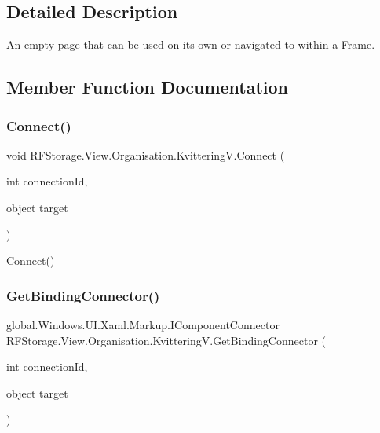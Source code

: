 \subsection{Detailed Description}
An empty page that can be used on its own or navigated to within a Frame. 



\subsection{Member Function Documentation}
\mbox{\label{class_r_f_storage_1_1_view_1_1_organisation_1_1_kvittering_v_aa1220cf181e4f10773feb090d1a0d6a0}} 
\subsubsection{\texorpdfstring{Connect()}{Connect()}}
{\footnotesize\ttfamily void R\+F\+Storage.\+View.\+Organisation.\+Kvittering\+V.\+Connect (\begin{DoxyParamCaption}\item[{int}]{connection\+Id,  }\item[{object}]{target }\end{DoxyParamCaption})}



\mbox{\hyperlink{class_r_f_storage_1_1_view_1_1_organisation_1_1_kvittering_v_aa1220cf181e4f10773feb090d1a0d6a0}{Connect()}} 

\mbox{\label{class_r_f_storage_1_1_view_1_1_organisation_1_1_kvittering_v_a2eb92c4d9d4ef6ab0aed08083044615f}} 
\subsubsection{\texorpdfstring{GetBindingConnector()}{GetBindingConnector()}}
{\footnotesize\ttfamily global.\+Windows.\+U\+I.\+Xaml.\+Markup.\+I\+Component\+Connector R\+F\+Storage.\+View.\+Organisation.\+Kvittering\+V.\+Get\+Binding\+Connector (\begin{DoxyParamCaption}\item[{int}]{connection\+Id,  }\item[{object}]{target }\end{DoxyParamCaption})}



